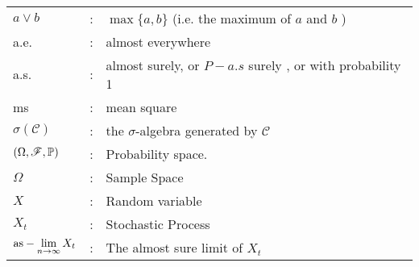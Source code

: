 \newpage
{}\\[3ex]
\begin{center}
	\begin{tabular}{l*{1}{c}l}
		$a\vee b$ & : &  $\max\{a, b\}$ (i.e. the maximum of $a$ and $b$ )\\[1ex]
		
		a.e. & : & almost everywhere\\[1ex]
		a.s.           & : & almost surely, or $P-a.s$ surely , or with probability 1 \\[1ex]
		ms           & : & mean square\\[1ex]
		$\sigma(\mathcal{C})$     & : & the $\sigma$-algebra generated by $\mathcal{C}$ \\[1ex]
		$(\Omega, \mathscr{F}, \mathbb{P})$ & : & Probability space.\\[1ex]
		$\Omega$ &:& Sample Space\\[1ex]
		$X$ &:& Random variable\\[1ex]
		$X_t$ &:& Stochastic Process\\[1ex]
		$\displaystyle\text{as}-\lim_{n\to\infty} X_t$ &:& The almost sure limit of $X_t$\\[1ex]
	\end{tabular}
\end{center}
